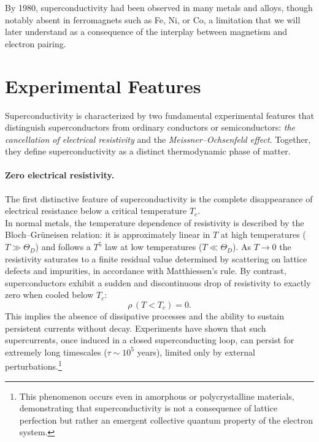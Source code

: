 By 1980, superconductivity had been observed in many metals and alloys, though notably absent in ferromagnets such as Fe, Ni, or Co, a limitation that we will later understand as a consequence of the interplay between magnetism and electron pairing.
%
%

\section{Experimental Features}
Superconductivity is characterized by two fundamental experimental features that distinguish superconductors from ordinary conductors or semiconductors: \textit{the cancellation of electrical resistivity} and the \textit{Meissner--Ochsenfeld effect}. 
Together, they define superconductivity as a distinct thermodynamic phase of matter.

\paragraph{Zero electrical resistivity.} 
The first distinctive feature of superconductivity is the complete disappearance of electrical resistance below a critical temperature \(T_c\). \\
In normal metals, the temperature dependence of resistivity is described by the
Bloch--Gr\"uneisen relation: it is approximately linear in $T$ at high temperatures
($T \gg \Theta_D$) and follows a $T^5$ law at low temperatures ($T \ll \Theta_D$).
As $T \to 0$ the resistivity saturates to a finite residual value determined by
scattering on lattice defects and impurities, in accordance with Matthiessen's rule.
By contrast, superconductors exhibit a sudden and discontinuous drop of resistivity to exactly zero when cooled below \(T_c\):
\begin{equation}
    \rho\, (T<T_c) = 0.
\end{equation}
This implies the absence of dissipative processes and the ability to sustain persistent currents without decay. 
Experiments have shown that such supercurrents, once induced in a closed superconducting loop, can persist for extremely long timescales (\(\tau \sim 10^5\) years), limited only by external perturbations.\footnote{This phenomenon occurs even in amorphous or polycrystalline materials, demonstrating that superconductivity is not a consequence of lattice perfection but rather an emergent collective quantum property of the electron system.}


